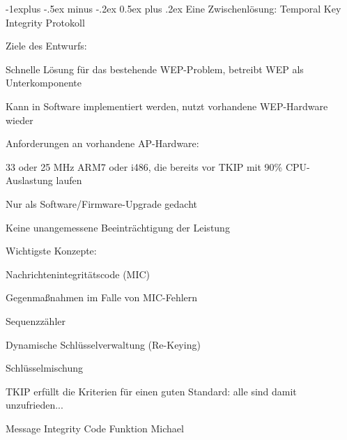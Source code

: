 \documentclass[a4paper]{article}
\makeatletter
\renewcommand{\subsection}{\@startsection{subsection}{2}{0mm}%
 {-1explus -.5ex minus -.2ex}%
 {0.5ex plus .2ex}%
 {\normalfont\normalsize\bfseries}}
\makeatother
\begin{document}
\begin{multicols}{3}
      \subsection{Eine Zwischenlösung: Temporal Key Integrity
            Protokoll}

      \begin{itemize*}
            \item Ziele des Entwurfs:
            \begin{itemize*}
                  \item Schnelle Lösung für das bestehende WEP-Problem, betreibt WEP als Unterkomponente
                  \item Kann in Software implementiert werden, nutzt vorhandene WEP-Hardware wieder
                  \item Anforderungen an vorhandene AP-Hardware:
                  \begin{itemize*} \item 33 oder 25 MHz ARM7 oder i486, die bereits vor TKIP mit 90\% CPU-Auslastung laufen \item Nur als Software/Firmware-Upgrade gedacht \item Keine unangemessene Beeinträchtigung der Leistung \end{itemize*}
            \end{itemize*}
            \item Wichtigste Konzepte:
            \begin{itemize*}
                  \item Nachrichtenintegritätscode (MIC)
                  \item Gegenmaßnahmen im Falle von MIC-Fehlern
                  \item Sequenzzähler
                  \item Dynamische Schlüsselverwaltung (Re-Keying)
                  \item Schlüsselmischung
            \end{itemize*}
            \item TKIP erfüllt die Kriterien für einen guten Standard: alle sind damit
            unzufrieden...
      \end{itemize*}

      Message Integrity Code Funktion Michael


\end{multicols}
\end{document}
